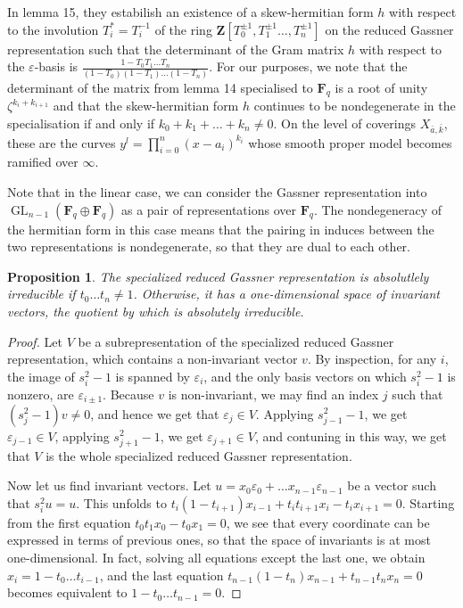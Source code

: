 \documentclass{article}
\newtheorem{proposition}[theorem]{Proposition}
\theoremstyle{definition}
\DeclareMathOperator{\GL}{\mathrm{GL}}
\begin{document}
	In lemma 15, they estabilish an existence of a skew-hermitian form $h$ with respect to the involution $T_i^* = T_i^{-1}$ of the ring $\mathbf{Z}[T_0^{\pm 1}, T_1^{\pm 1}\ldots, T_n^{\pm 1}]$ on the reduced Gassner representation such that the determinant of the Gram matrix $h$ with respect to the $\varepsilon$-basis is $\frac{1 - T_0 T_1 \ldots T_n}{(1-T_0)(1-T_1) \ldots (1-T_n)}$. For our purposes, we note that the determinant of the matrix from lemma 14 specialised to $\mathbf{F}_q$ is a root of unity $\zeta^{k_i + k_{i+1}}$ and that the skew-hermitian form $h$ continues to be nondegenerate in the specialisation if and only if $k_0 + k_1 + \ldots + k_n \neq 0$. On the level of coverings $X_{\bar{a}, \bar{k}}$, these are the curves $y^l = \prod_{i=0}^n (x-a_i)^{k_i}$ whose smooth proper model becomes ramified over $\infty$. \par 
	Note that in the linear case, we can consider the Gassner representation into $\GL_{n-1}(\mathbf{F}_q \oplus \mathbf{F}_q)$ as a pair of representations over $\mathbf{F}_q$. The nondegeneracy of the hermitian form in this case means that the pairing in induces between the two representations is nondegenerate, so that they are dual to each other. 
	\begin{proposition} \label{irreducibility}
		The specialized reduced Gassner representation is absolutlely irreducible if $t_0 \ldots t_n \neq 1$. Otherwise, it has a one-dimensional space of invariant vectors, the quotient by which is absolutely irreducible.
	\end{proposition}
	\begin{proof}
		Let $V$ be a subrepresentation of the specialized reduced Gassner representation, which contains a non-invariant vector $v$. By inspection, for any $i$, the image of $s_i^2-1$ is spanned by $\varepsilon_i$, and the only basis vectors on which $s_i^2-1$ is nonzero, are $\varepsilon_{i \pm 1}$. Because $v$ is non-invariant, we may find an index $j$ such that $(s_j^2 - 1) v \neq 0$, and hence we get that $\varepsilon_j \in V$. Applying $s_{j-1}^2 - 1$, we get $\varepsilon_{j-1} \in V$, applying  $s_{j+1}^2 - 1$, we get $\varepsilon_{j+1} \in V$, and contuning in this way, we get that $V$ is the whole specialized reduced Gassner representation. \par 
		Now let us find invariant vectors. Let $u = x_0\varepsilon_0+ \ldots x_{n-1} \varepsilon_{n-1}$ be a vector such that $s_i^2 u = u$. This unfolds to $t_i(1-t_{i+1})x_{i-1} + t_it_{i+1}x_i-t_ix_{i+1}=0$. Starting from the first equation $t_0t_1x_0-t_0x_1=0$, we see that every coordinate can be expressed in terms of previous ones, so that the space of invariants is at most one-dimensional. In fact, solving all equations except the last one, we obtain $x_i = 1 - t_0 \ldots t_{i-1}$, and the last equation $t_{n-1}(1-t_n)x_{n-1}+t_{n-1}t_nx_n=0$ becomes equivalent to $1-t_0\ldots t_{n-1}=0$.
	\end{proof}
\end{document}
